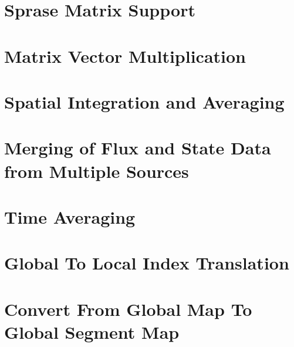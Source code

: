 \documentclass{article}
\begin{document}
\section{Sprase Matrix Support}

\vspace*{\fill}
\newpage
%

\vspace*{\fill}
\newpage
%

\vspace*{\fill}
\newpage
%

\vspace*{\fill}
\newpage
%
%
\section{Matrix Vector Multiplication}

\vspace*{\fill}
\newpage
%
\section{Spatial Integration and Averaging}

\vspace*{\fill}
\newpage

\vspace*{\fill}
\newpage
%
\section{Merging of Flux and State Data from Multiple Sources}

\vspace*{\fill}
\newpage
%
\section{Time Averaging}

\vspace*{\fill}
\newpage
%

\vspace*{\fill}
\newpage
%
\section{Global To Local Index Translation}

\vspace*{\fill}
\newpage
%
\section{Convert From Global Map To Global Segment Map}

\vspace*{\fill}
\newpage
\end{document}
